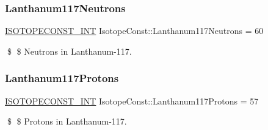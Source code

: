 \subsubsection{\texorpdfstring{Lanthanum117\+Neutrons}{Lanthanum117Neutrons}}
{\footnotesize\ttfamily \mbox{\hyperlink{group___isotope_const-_macros_ga5f18360b3e99483a35c32d789e62621c}{I\+S\+O\+T\+O\+P\+E\+C\+O\+N\+S\+T\+\_\+\+I\+NT}} Isotope\+Const\+::\+Lanthanum117\+Neutrons = 60}

\$ \$ Neutrons in Lanthanum-\/117. \mbox{\label{group___isotope_const-_lanthanum-_la117_ga1bca40f3784a30faf4ad78be9dffded7}} 
\subsubsection{\texorpdfstring{Lanthanum117\+Protons}{Lanthanum117Protons}}
{\footnotesize\ttfamily \mbox{\hyperlink{group___isotope_const-_macros_ga5f18360b3e99483a35c32d789e62621c}{I\+S\+O\+T\+O\+P\+E\+C\+O\+N\+S\+T\+\_\+\+I\+NT}} Isotope\+Const\+::\+Lanthanum117\+Protons = 57}

\$ \$ Protons in Lanthanum-\/117. 
